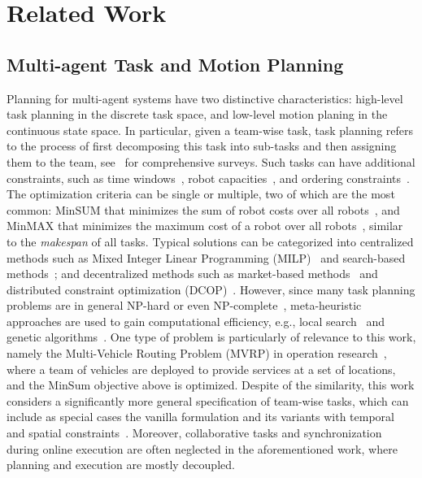 \section{Related Work}\label{sec:related-work}




\subsection{Multi-agent Task and Motion Planning}\label{subsec:multi-tamp}
Planning for multi-agent systems have two distinctive characteristics:
high-level task planning in the discrete task space,
and low-level motion planing in the continuous state space.
In particular,
given a team-wise task, task planning refers to the process of first decomposing this task into sub-tasks
and then assigning them to the team, see~\cite{torreno2017cooperative,gini2017multi, khamis2015multi} for comprehensive surveys.
Such tasks can have additional constraints,
such as time windows~\cite{luo2015distributed}, robot capacities~\cite{fukasawa2006robust},
and ordering constraints~\cite{boerkoel2013distributed, nunes2015multi}.
The optimization criteria can be single or multiple,
two of which are the most common:
MinSUM that minimizes the sum of robot costs over all robots~\cite{gini2017multi, luo2015distributed, fukasawa2006robust},
and MinMAX that minimizes the maximum cost of a robot over all robots~\cite{nunes2015multi},
similar to the \emph{makespan} of all tasks.
Typical solutions can be categorized into centralized methods such as
Mixed Integer Linear Programming (MILP)~\cite{torreno2017cooperative} and search-based methods~\cite{fukasawa2006robust};
and decentralized methods such as
market-based methods~\cite{luo2015distributed} and distributed constraint optimization (DCOP)~\cite{boerkoel2013distributed}.
However, since many task planning problems are in general NP-hard or even NP-complete~\cite{gini2017multi},
meta-heuristic approaches are used to gain computational efficiency,
e.g., local search~\cite{hoos2004stochastic} and genetic algorithms~\cite{khamis2015multi}.
One type of problem is particularly of relevance to this work,
namely the Multi-Vehicle Routing Problem (MVRP) in operation research~\cite{gini2017multi, khamis2015multi},
where a team of vehicles are deployed to provide services at a set of locations,
and the MinSum objective above is optimized.
Despite of the similarity,
this work considers a significantly more general specification of team-wise tasks,
which can include as special cases the vanilla formulation and its variants with
temporal and spatial constraints~\cite{boerkoel2013distributed, nunes2015multi}.
Moreover, collaborative tasks and synchronization during online execution are often neglected in the aforementioned work, where planning and execution are mostly decoupled.


